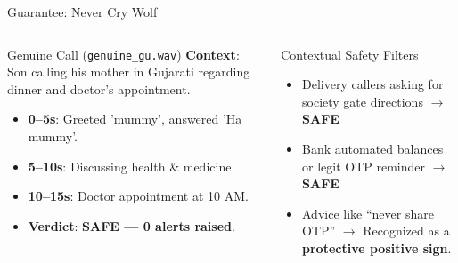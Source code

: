 \documentclass[aspectratio=169,10pt]{beamer}
\begin{document}
\begin{frame}{Guarantee: Never Cry Wolf}
\begin{columns}[T]
\begin{exampleblock}{Genuine Call (\texttt{genuine\_gu.wav})}
\textbf{Context}: Son calling his mother in Gujarati regarding dinner and doctor's appointment.
\begin{itemize}
    \item \textbf{0--5s}: Greeted 'mummy', answered 'Ha mummy'.
    \item \textbf{5--10s}: Discussing health \& medicine.
    \item \textbf{10--15s}: Doctor appointment at 10 AM.
    \item \textbf{Verdict}: \textbf{SAFE --- 0 alerts raised}.
\end{itemize}
\end{exampleblock}

\begin{block}{Contextual Safety Filters}
\begin{itemize}
    \item Delivery callers asking for society gate directions $\rightarrow$ \textbf{SAFE}
    \item Bank automated balances or legit OTP reminder $\rightarrow$ \textbf{SAFE}
    \item Advice like ``never share OTP'' $\rightarrow$ Recognized as a \textbf{protective positive sign}.
\end{itemize}
\end{block}
\end{columns}
\end{frame}
\end{document}
